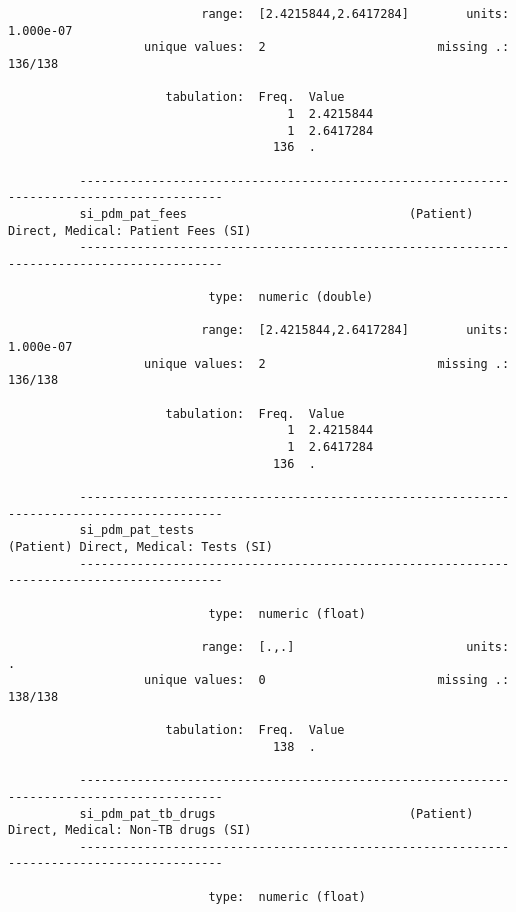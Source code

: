 \documentclass{article}
\begin{document}
\begin{verbatim}
                           range:  [2.4215844,2.6417284]        units:  1.000e-07
                   unique values:  2                        missing .:  136/138
          
                      tabulation:  Freq.  Value
                                       1  2.4215844
                                       1  2.6417284
                                     136  .
          
          ------------------------------------------------------------------------------------------
          si_pdm_pat_fees                               (Patient) Direct, Medical: Patient Fees (SI)
          ------------------------------------------------------------------------------------------
          
                            type:  numeric (double)
          
                           range:  [2.4215844,2.6417284]        units:  1.000e-07
                   unique values:  2                        missing .:  136/138
          
                      tabulation:  Freq.  Value
                                       1  2.4215844
                                       1  2.6417284
                                     136  .
          
          ------------------------------------------------------------------------------------------
          si_pdm_pat_tests                                     (Patient) Direct, Medical: Tests (SI)
          ------------------------------------------------------------------------------------------
          
                            type:  numeric (float)
          
                           range:  [.,.]                        units:  .
                   unique values:  0                        missing .:  138/138
          
                      tabulation:  Freq.  Value
                                     138  .
          
          ------------------------------------------------------------------------------------------
          si_pdm_pat_tb_drugs                           (Patient) Direct, Medical: Non-TB drugs (SI)
          ------------------------------------------------------------------------------------------
          
                            type:  numeric (float)
          

\end{verbatim}
\end{document}
